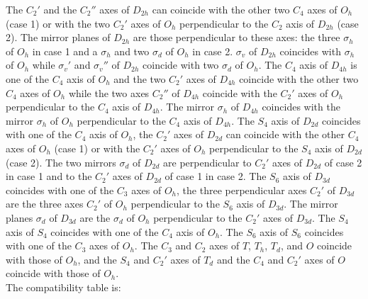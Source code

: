 \documentclass[12pt,a4paper]{article}
\begin{document}
The $C_2'$ and the $C_2''$ axes of $D_{2h}$ can coincide with the other two 
$C_4$ axes of $O_h$ (case 1) or with the two $C_2'$ axes of $O_h$
perpendicular to the $C_2$ axis of $D_{2h}$ (case 2). The mirror planes of 
$D_{2h}$ are those 
perpendicular to these axes: the three $\sigma_h$ of $O_h$ in case 1 and a
$\sigma_h$ and two $\sigma_d$ of $O_h$ in case 2. $\sigma_v$ of $D_{2h}$
coincides with $\sigma_h$ of $O_h$ while $\sigma_v'$ and $\sigma_v''$
of $D_{2h}$ coincide with two $\sigma_d$ of $O_h$.
The $C_4$ axis of $D_{4h}$ is
one of the $C_4$ axis of $O_h$ and the two $C_2'$ axes of $D_{4h}$ coincide 
with the other two $C_4$ axes of $O_h$ while the two axes $C_2''$ of $D_{4h}$ 
coincide with the $C_2'$ axes of $O_h$ perpendicular to the $C_4$ axis of 
$D_{4h}$.
The mirror $\sigma_h$ of $D_{4h}$ coincides with the mirror $\sigma_h$ of
$O_h$ perpendicular to the $C_4$ axis of $D_{4h}$.
The $S_4$ axis of $D_{2d}$ coincides with one of the $C_4$ axis of $O_h$,
the $C_2'$ axes of $D_{2d}$ can coincide with the other $C_4$ axes of 
$O_h$ (case 1) or with the $C_2'$ axes of $O_h$ perpendicular to the $S_4$ 
axis of $D_{2d}$ (case 2). The two mirrors $\sigma_d$ of $D_{2d}$ are 
perpendicular to $C_2'$ axes of $D_{2d}$ of case 2 in case 1 and to the $C_2'$
axes of $D_{2d}$ of case 1 in case 2.
The $S_6$ axis of $D_{3d}$ coincides with one of the $C_3$ axes
of $O_h$, the three perpendicular axes $C_2'$ of $D_{3d}$ are the three axes 
$C_2'$ of $O_h$ perpendicular to the $S_6$ axis of $D_{3d}$. The mirror planes 
$\sigma_d$ of $D_{3d}$ are the $\sigma_d$ of $O_h$ perpendicular to the $C_2'$ 
axes of $D_{3d}$.
The $S_4$ axis of $S_4$ coincides with one of the $C_4$ axis of $O_h$. 
The $S_6$ axis of $S_6$ coincides with one of the $C_3$ axes of $O_h$. 
The $C_3$ and $C_2$ axes of $T$, $T_h$, $T_d$, and
$O$ coincide with those of $O_h$, and the $S_4$ and $C_2'$ axes of $T_d$ and
the $C_4$ and $C_2'$ axes of $O$ coincide with those of $O_h$. \\
The compatibility table is:
\end{document}
